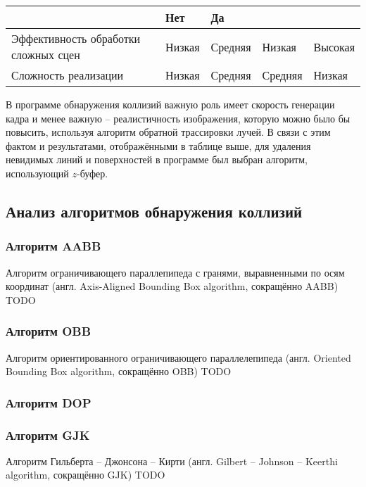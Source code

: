 \begin{adjustbox}{width=1\textwidth}
\begin{tabular}{|p{}|p{}|p{}|p{}|p{}|}
        &
        \cellcolor{red!10}
        Нет
        &
        \cellcolor{green!10}
        Да
        \\
        \hline
        Эффективность обработки сложных сцен
        &
        \cellcolor{red!10}
        Низкая
        &
        \cellcolor{yellow!10}
        Средняя
        &
        \cellcolor{red!10}
        Низкая
        &
        \cellcolor{green!10}
        Высокая
        \\
        \hline
        Сложность реализации
        &
        \cellcolor{green!10}
        Низкая
        &
        \cellcolor{yellow!10}
        Средняя
        &
        \cellcolor{yellow!10}
        Средняя
        &
        \cellcolor{green!10}
        Низкая
        \\
        \hline
    \end{tabular}
\end{adjustbox}

\vspace{0.5cm}

В программе обнаружения коллизий важную роль имеет скорость генерации кадра и
менее важную -- реалистичность изображения, которую можно было бы повысить,
используя алгоритм обратной трассировки лучей. В связи с этим фактом и
результатами, отображёнными в таблице выше, для удаления невидимых линий и
поверхностей в программе был выбран алгоритм, использующий $z$-буфер.

\subsection{Анализ алгоритмов обнаружения коллизий}

\subsubsection{Алгоритм AABB}

Алгоритм ограничивающего параллепипеда с гранями, выравненными по осям координат (англ. Axis-Aligned Bounding Box algorithm, сокращённо AABB) TODO

\subsubsection{Алгоритм OBB}

Алгоритм ориентированного ограничивающего параллелепипеда (англ. Oriented Bounding Box algorithm, сокращённо OBB) TODO

\subsubsection{Алгоритм DOP}
\subsubsection{Алгоритм GJK}

Алгоритм Гильберта -- Джонсона -- Кирти (англ. Gilbert -- Johnson -- Keerthi algorithm, сокращённо GJK) TODO
